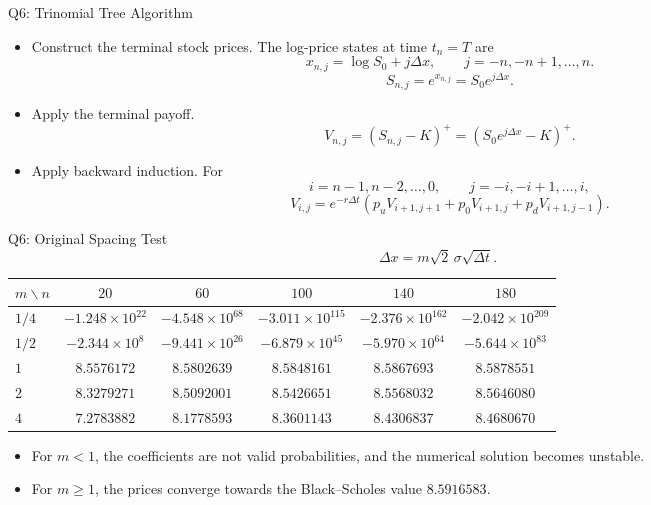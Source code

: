 \documentclass{beamer}
\begin{document}
\begin{frame}{Q6: Trinomial Tree Algorithm}

\begin{itemize}
\item Construct the terminal stock prices.
The log-price states at time \(t_n=T\) are
\[
x_{n,j}=\log S_0+j\Delta x,
\qquad
j=-n,-n+1,\ldots,n.
\]
\[
\boxed{
S_{n,j}
=
e^{x_{n,j}}
=
S_0e^{j\Delta x}.
}
\]
\item Apply the terminal payoff.
\[
\boxed{
V_{n,j}
=
(S_{n,j}-K)^+
=
\left(S_0e^{j\Delta x}-K\right)^+.
}
\]
\item Apply backward induction.
For
\[
i=n-1,n-2,\ldots,0,
\qquad
j=-i,-i+1,\ldots,i,
\]
\[
\boxed{
V_{i,j}
=
e^{-r\Delta t}
\left(
p_uV_{i+1,j+1}
+p_0V_{i+1,j}
+p_dV_{i+1,j-1}
\right).
}
\]
\end{itemize}
\end{frame}

\begin{frame}{Q6: Original Spacing Test}
\[
\Delta x=m\sqrt{2}\,\sigma\sqrt{\Delta t}.
\]

\begin{table}
\centering
\scriptsize
\setlength{\tabcolsep}{4.5pt}
\renewcommand{\arraystretch}{1.25}

\begin{tabular}{@{}lccccc@{}}
\toprule
\(m\backslash n\)
& \(20\) & \(60\) & \(100\) & \(140\) & \(180\)\\
\midrule

\(1/4\)
& \(-1.248\times10^{22}\)
& \(-4.548\times10^{68}\)
& \(-3.011\times10^{115}\)
& \(-2.376\times10^{162}\)
& \(-2.042\times10^{209}\)\\

\(1/2\)
& \(-2.344\times10^{8}\)
& \(-9.441\times10^{26}\)
& \(-6.879\times10^{45}\)
& \(-5.970\times10^{64}\)
& \(-5.644\times10^{83}\)\\

\(1\)
& \(8.5576172\)
& \(8.5802639\)
& \(8.5848161\)
& \(8.5867693\)
& \(8.5878551\)\\

\(2\)
& \(8.3279271\)
& \(8.5092001\)
& \(8.5426651\)
& \(8.5568032\)
& \(8.5646080\)\\

\(4\)
& \(7.2783882\)
& \(8.1778593\)
& \(8.3601143\)
& \(8.4306837\)
& \(8.4680670\)\\

\bottomrule
\end{tabular}
\end{table}

\begin{itemize}
    \item For \(m<1\), the coefficients are not valid probabilities,
    and the numerical solution becomes unstable.
    \item For \(m\geq1\), the prices converge towards the
    Black--Scholes value \(8.5916583\).
\end{itemize}
\end{frame}
\end{document}
